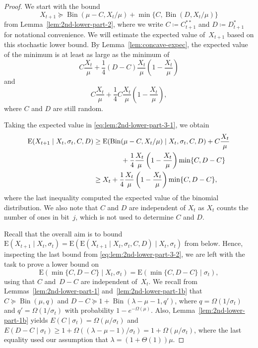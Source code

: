 \documentclass[11pt, a4paper]{article}
\newcommand*{\E}{\mathrm{E}}
\DeclareMathOperator{\Bin}{Bin}
\begin{document}
\begin{proof}		
		We start with  
		the bound 
		\begin{equation}
		X_{t+1}\succeq \Bin(\mu-C,X_t/\mu)+\min\{C,\Bin(D,X_t/\mu)\}
		\label{eq:lem:2nd-lower-part-3-1}
		\end{equation}
		from Lemma~\ref{lem:2nd-lower-part-2}, where we write  $C\coloneqq C^{**}_{t+1}$ and 
		$D\coloneqq D^*_{t+1}$ for notational convenience. We will estimate the expected value 
		of~$X_{t+1}$ based on this stochastic lower bound. By Lemma~\ref{lem:concave-expec}, 
		the expected value of the minimum is at least as large as the minimum of \[
		C\frac{X_t}{\mu}+\frac{1}{4} (D-C)\frac{X_t}{\mu}\left(1-\frac{X_t}{\mu}\right)\] 
		and 
		\[
		C\frac{X_t}{\mu}+ \frac{1}{4} C\frac{X_t}{\mu}\left(1-\frac{X_t}{\mu}\right),
		\]
		where $C$ and $D$ are still random. 
		
	  Taking the expected value in \eqref{eq:lem:2nd-lower-part-3-1}, we obtain 
		\begin{align}
		 \E(X_{t+1} \mid X_t,\sigma_t,C,D)  & \ge 
		\E(\Bin(\mu-C,X_t/\mu)\mid X_t, \sigma_t, C,D)  
		 + 
		C \frac{X_t}{\mu}  \notag\\ 
		& \qquad\qquad + \frac{1}{4} \frac{X_t}{\mu}\left(1-\frac{X_t}{\mu}\right) \min\{C,D-C\}\notag\\
		& \ge X_t + \frac{1}{4} \frac{X_t}{\mu}\left(1-\frac{X_t}{\mu}\right) \min\{C,D-C\},
		\label{eq:lem:2nd-lower-part-3-2}
		\end{align}
		where the last inequality computed the expected value of the binomial distribution. We also note that $C$ and $D$ are independent 
		of $X_t$ as $X_t$ counts the number of ones in bit~$j$, which is not used to determine $C$ and $D$.
		
		Recall that the overall aim is to bound $\E(X_{t+1} \mid X_t,\sigma_t) = \E(\E(X_{t+1} \mid X_t,\sigma_t,C,D)\mid X_t,\sigma_t)$ from below. 
		Hence, inspecting the last bound from \eqref{eq:lem:2nd-lower-part-3-2}, 
		we are left with the task to prove a lower bound on 
		\[\E(\min\{C,D-C\}\mid X_t,\sigma_t) = \E(\min\{C,D-C\}\mid \sigma_t),\]
		using that $C$ and~$D-C$ are independent of~$X_t$. 
		We recall from Lemmas~\ref{lem:2nd-lower-part-1} and~\ref{lem:2nd-lower-part-1b} that $C\succeq \Bin(\mu,q)$ and 
		$D-C\succeq 1+\Bin(\lambda-\mu-1,q')$, where $q=\Omega(1/\sigma_t)$ and $q'=\Omega(1/\sigma_t)$ with probability 
		$1-e^{-\Omega(\mu)}$. 
		Also, Lemma~\ref{lem:2nd-lower-part-1b} yields $E(C\mid \sigma_t)=\Omega(\mu/\sigma_t)$ and 
		$E(D-C\mid \sigma_t)\ge 1+\Omega((\lambda-\mu-1)/\sigma_t) = 1 + \Omega(\mu/\sigma_t) $, where the last equality used our assumption that 
		$\lambda=(1+\Theta(1))\mu$.
		

\end{proof}
\end{document}
